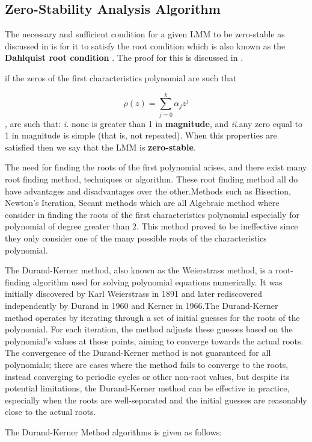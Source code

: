 \subsection{Zero-Stability Analysis Algorithm}
The necessary and sufficient condition for a given LMM to be zero-stable as discussed in \cite{2022JFatokunEtAl} is for it to satisfy the root condition which is also known as the \textbf{Dahlquist root condition} \cite{lambert1977}. The proof for this is discussed in \cite{keller2020discovery}.

if the zeros of the first characteristics polynomial are such that

\[\rho(z) = \sum_{j=0}^{k}\alpha_jz^{j}\], are such that: \textit{i.} none is greater than 1 in \textbf{magnitude}, and \textit{ii.}any zero equal to 1 in magnitude is simple (that is, not repeated). When this properties are satisfied then we say that the LMM is \textbf{zero-stable}.

The need for finding the roots of the first polynomial arises, and there exist many root finding method, techniques or algorithm. These root finding method all do have advantages and disadvantages over the other.Methods such as Bisection, Newton's Iteration, Secant methods which are all Algebraic method where consider in finding the roots of the first characteristics polynomial especially for polynomial of degree greater than $2$. This method proved to be ineffective since they only consider one of the many possible roots of the characteristics polynomial.

The Durand-Kerner method, also known as the Weierstrass method, is a root-finding algorithm used for solving polynomial equations numerically. It was initially discovered by Karl Weierstrass in 1891 and later rediscovered independently by Durand in 1960 and Kerner in 1966.The Durand-Kerner method operates by iterating through a set of initial guesses for the roots of the polynomial. For each iteration, the method adjusts these guesses based on the polynomial's values at those points, aiming to converge towards the actual roots. The convergence of the Durand-Kerner method is not guaranteed for all polynomials; there are cases where the method fails to converge to the roots, instead converging to periodic cycles or other non-root values, but despite its potential limitations, the Durand-Kerner method can be effective in practice, especially when the roots are well-separated and the initial guesses are reasonably close to the actual roots.

The Durand-Kerner Method algorithms is given as follows:

